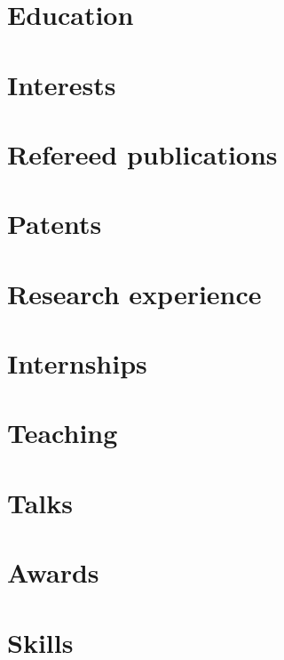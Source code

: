 \documentclass[10pt]{article}
\begin{document}



\section{Education}\label{sec:education}



\section{Interests}\label{sec:interests}



\section{Refereed publications}\label{sec:refereed-publications}



\section{Patents}\label{sec:patents}



\section{Research experience}\label{sec:research-experience}



\section{Internships}\label{sec:internships}



\section{Teaching}\label{sec:teaching}



\section{Talks}\label{sec:talks}



\section{Awards}\label{sec:fellowships-and-awards}



\section{Skills}\label{sec:skills}

\end{document}
